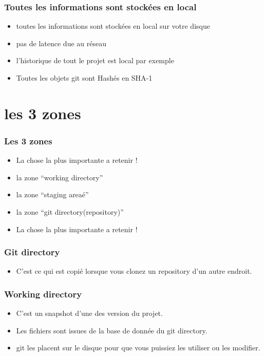 \documentclass{beamer}
\begin{document}
   \begin{frame}
      \frametitle{Toutes les informations sont stockées en local}
      \begin{itemize}
        \item toutes les informations sont stockées en local sur votre disque
        \item pas de latence due au réseau
        \item l'historique de tout le projet est local par exemple
        \item Toutes les objets git sont Hashés en SHA-1
      \end{itemize}
    \end{frame}
   \section{les 3 zones}

   \begin{frame}
     \frametitle{Les 3 zones}
     \begin{itemize}
     \item \alert{La chose la plus importante a retenir !}
     \item la zone ``working directory''
     \item la zone ``staging areaé''
     \item la zone ``git directory(repository)''
     \item \alert{La chose la plus importante a retenir !}
     \end{itemize}
   \end{frame}

  \begin{frame}
     \frametitle{Git directory}
     \begin{itemize}
     \item C'est ce qui est copié lorsque vous clonez un repository d'un autre endroit.
     \end{itemize}
   \end{frame}

  \begin{frame}
     \frametitle{Working directory}
     \begin{itemize}
     \item C'est un snapshot d'une des version du projet.
     \item Les fichiers sont issues de la base de donnée du git directory.
     \item git les placent sur le disque pour que vous puissiez les utiliser ou les modifier.
     \end{itemize}
   \end{frame}
\end{document}
